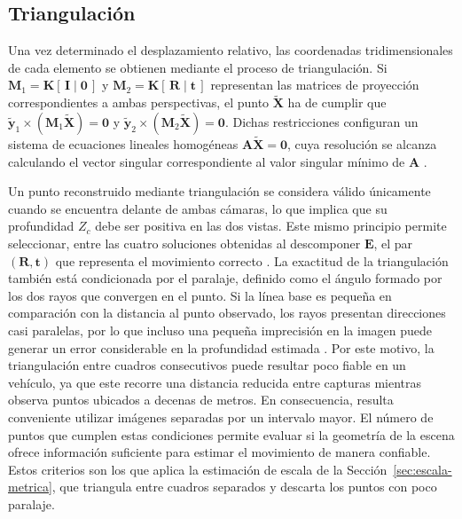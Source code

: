 \subsection{Triangulación}
\label{sec:triangulacion}

Una vez determinado el desplazamiento relativo, las coordenadas tridimensionales de cada elemento se obtienen mediante el proceso de triangulación.
Si $\mathbf{M}_1 = \mathbf{K}[\,\mathbf{I}\mid\mathbf{0}\,]$ y $\mathbf{M}_2 = \mathbf{K}[\,\mathbf{R}\mid\mathbf{t}\,]$ representan las matrices de proyección correspondientes a ambas perspectivas, el punto $\tilde{\mathbf{X}}$ ha de cumplir que $\tilde{\mathbf{y}}_1 \times (\mathbf{M}_1\tilde{\mathbf{X}}) = \mathbf{0}$ y $\tilde{\mathbf{y}}_2 \times (\mathbf{M}_2\tilde{\mathbf{X}}) = \mathbf{0}$.
Dichas restricciones configuran un sistema de ecuaciones lineales homogéneas $\mathbf{A}\tilde{\mathbf{X}} = \mathbf{0}$, cuya resolución se alcanza calculando el vector singular correspondiente al valor singular mínimo de $\mathbf{A}$ \cite{hartley2003mvg}.

Un punto reconstruido mediante triangulación se considera válido únicamente cuando se encuentra delante de ambas cámaras, lo que implica que su profundidad $Z_c$ debe ser positiva en las dos vistas.
Este mismo principio permite seleccionar, entre las cuatro soluciones obtenidas al descomponer $\mathbf{E}$, el par $(\mathbf{R},\mathbf{t})$ que representa el movimiento correcto \cite{hartley2003mvg}.
La exactitud de la triangulación también está condicionada por el paralaje, definido como el ángulo formado por los dos rayos que convergen en el punto.
Si la línea base es pequeña en comparación con la distancia al punto observado, los rayos presentan direcciones casi paralelas, por lo que incluso una pequeña imprecisión en la imagen puede generar un error considerable en la profundidad estimada \cite{hartley2003mvg}.
Por este motivo, la triangulación entre cuadros consecutivos puede resultar poco fiable en un vehículo, ya que este recorre una distancia reducida entre capturas mientras observa puntos ubicados a decenas de metros.
En consecuencia, resulta conveniente utilizar imágenes separadas por un intervalo mayor.
El número de puntos que cumplen estas condiciones permite evaluar si la geometría de la escena ofrece información suficiente para estimar el movimiento de manera confiable.
Estos criterios son los que aplica la estimación de escala de la Sección~\ref{sec:escala-metrica}, que triangula entre cuadros separados y descarta los puntos con poco paralaje.


